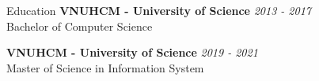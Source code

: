 \documentclass{resume} %
\begin{document}

\begin{rSection}{Education}
{\bf VNUHCM - University of Science} \hfill {\em 2013 - 2017 } 
\\ Bachelor of Computer Science %

{\bf VNUHCM - University of Science} \hfill {\em 2019 - 2021 } 
\\ Master of Science in Information System %


\end{rSection}
\end{document}
